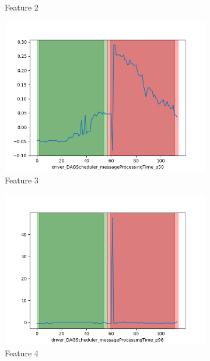 \documentclass[oneside, a4paper, onecolumn, 11pt]{article}
\begin{document}
\begin{figure}[H]
\begin{subfigure}{0.30\textwidth}
      \caption{Feature 2}
  \end{subfigure}
  \begin{subfigure}{0.30\textwidth}
    \centering
    \includegraphics[width=\linewidth]{images/ex3.png}
    \caption{Feature 3}
\end{subfigure}
\begin{subfigure}{0.30\textwidth}
  \centering
  \includegraphics[width=\linewidth]{images/ex4.png}
  \caption{Feature 4}
\end{subfigure}
\begin{subfigure}{0.30\textwidth}
  \centering

\end{subfigure}
\end{figure}
\end{document}

